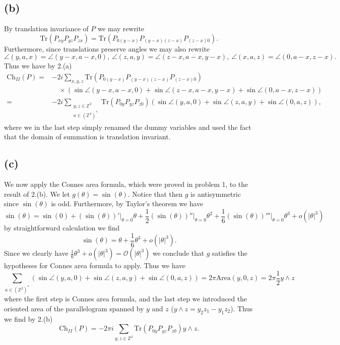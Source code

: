 \documentclass[a4paper,11pt]{article}
\newcommand{\abs}[1]{\left\lvert #1 \right\rvert}
\newcommand{\trace}[1]{\text{Tr}\left(#1\right)}
\newcommand{\Z}{\mathbb{Z}}
\newcommand{\Area}{\text{Area}}
\numberwithin{equation}{section}
\begin{document}
\subsection*{(b)}
By translation invariance of $ P $ we may rewrite\begin{equation}
\trace{P_{xy}P_{yz}P_{zx}}=\trace{P_{0(y-x)}P_{(y-x)(z-x)}P_{(z-x)0}}.
\end{equation}
Furthermore, since translations preserve angles we may also rewrite \begin{equation}
\angle(y,a,x)=\angle(y-x,a-x,0),\ \angle(z,a,y)=\angle(z-x,a-x,y-x),\ \angle(x,a,z)=\angle(0,a-x,z-x).
\end{equation}
Thus we have by 2.(a) \begin{equation}
\begin{aligned}
\text{Ch}_{II}(P)=&-2i\sum_{x,y,z}\trace{P_{0(y-x)}P_{(y-x)(z-x)}P_{(z-x)0}}\\&\quad\times\left(\sin\angle(y-x,a-x,0)+\sin\angle(z-x,a-x,y-x)+\sin\angle(0,a-x,z-x)\right)\\
=&-2i\sum_{\substack{y,z\in\Z^2\\ a\in(\Z^2)^*}}\trace{P_{0y}P_{yz}P_{z0}}\left(\sin\angle(y,a,0)+\sin\angle(z,a,y)+\sin\angle(0,a,z)\right),
\end{aligned}
\end{equation}
where we in the last step simply renamed the dummy variables and used the fact that the domain of summation is translation invariant.
\subsection*{(c)}
We now apply the Connes area formula, which were proved in problem 1, to the result of 2.(b). We let $ g(\theta)=\sin(\theta) $. Notice that then $ g $ is antisymmetric since $ \sin(\theta) $ is odd. Furthermore, by Taylor's theorem we have \begin{equation}
\sin(\theta)=\sin(0)+(\sin(\theta))'\rvert_{\theta=0}\theta+\frac{1}{2}(\sin(\theta))''\rvert_{\theta=0}\theta^2+\frac{1}{6}(\sin(\theta))'''\rvert_{\theta=0}\theta^3+o(\abs{\theta}^3)
\end{equation} 
by straightforward calculation we find\begin{equation}
\sin(\theta)=\theta+\frac{1}{6}\theta^3+o(\abs{\theta}^3).
\end{equation} 
Since we clearly have $ \frac{1}{6}\theta^3+o(\abs{\theta}^3)=\mathcal{O}(\abs{\theta}^3) $ we conclude that $ g $ satisfies the hypotheses for Connes area formula to apply. Thus we have \begin{equation}
\sum_{a\in(\Z^2)^*}\left(\sin\angle(y,a,0)+\sin\angle(z,a,y)+\sin\angle(0,a,z)\right)=2\pi \Area(y,0,z)=2\pi \frac{1}{2}y\wedge z
\end{equation} 
where the first step is Connes area formula, and the last step we introduced the oriented area of the parallelogram spanned by $ y $ and $ z $ ($ y\wedge z=y_2z_1-y_1z_2 $). Thus we find by 2.(b)\begin{equation}
\text{Ch}_{II}(P)=-2\pi i\sum_{y,z\in\Z^2}\trace{P_{0y}P_{yz}P_{z0}}y\wedge z.
\end{equation}
\end{document}
